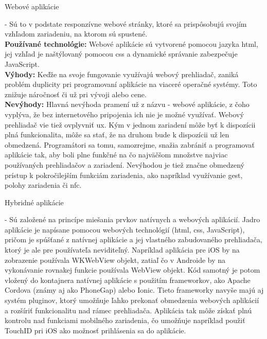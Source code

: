 \begin{itemize}[leftmargin=*]
{\bf \item Webové aplikácie} - Sú to v podstate responzívne webové stránky, ktoré sa prispôsobujú svojím vzhľadom zariadeniu, na ktorom sú spustené. \cite{ma3} \\

{\bf Používané technológie:} Webové aplikácie sú vytvorené pomocou jazyka \acrshort{html}, jej vzhľad je naštýlovaný pomocou \acrshort{css} a dynamické správanie zabezpečuje JavaScript. \\

{\bf Výhody:} Keďže na svoje fungovanie využívajú webový prehliadač, zaniká problém duplicity pri programovaní aplikácie na viaceré operačné systémy. Toto znižuje náročnosť či už pri vývoji alebo cene. \cite{ma3} \\

{\bf Nevýhody:} Hlavná nevýhoda pramení už z názvu - webové aplikácie, z čoho vyplýva, že bez internetového pripojenia ich nie je možné využívať. Webový prehliadač vie tiež ovplyvniť \acrshort{ux}. Kým v jednom zariadení môže byť k dispozícii plná funkcionalita, môže sa stať, že na druhom bude k dispozícii už len obmedzená. Programátori sa tomu, samozrejme, snažia zabrániť a programovať aplikácie tak, aby boli plne funkčné na čo najväčšom množstve najviac používaných prehliadačov a zariadení. Nevýhodou je tiež značne obmedzený prístup k pokročilejším funkciám zariadenia, ako napríklad využívanie gest, polohy zariadenia či \acrshort{nfc}. \cite{ma3} \\
 
{\bf \item Hybridné aplikácie} - Sú založené na princípe miešania prvkov natívnych a webových aplikácií. Jadro aplikácie je napísane pomocou webových technológií (\acrshort{html}, \acrshort{css}, JavaScript), pričom je spúšťané z natívnej aplikácie a jej vlastného zabudovaného prehliadača, ktorý je ale pre používateľa neviditeľný. Napríklad aplikácia pre iOS by na zobrazenie používala WKWebView objekt, zatiaľ čo v Androide by na vykonávanie rovnakej funkcie používala WebView objekt. Kód samotný je potom vložený do kontajnera natívnej aplikácie s použitím frameworkov, ako Apache Cordova (známy aj ako PhoneGap) alebo Ionic. Tieto frameworky navyše majú aj systém pluginov, ktorý umožňuje ľahko prekonať obmedzenia webových aplikácií a rozšíriť funkcionalitu nad rámec prehliadača. Aplikácia tak môže získať plnú kontrolu nad funkciami mobilného zariadenia, čo umožňuje napríklad použiť TouchID pri iOS ako možnosť prihlásenia sa do aplikácie. \cite{ma4} \\



\end{itemize}
